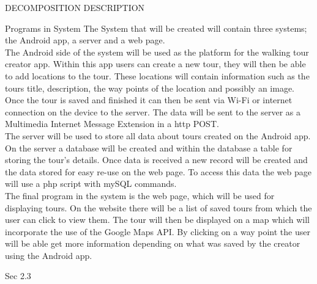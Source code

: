 \documentclass{article}
\begin{document}
	\begin{section}{DECOMPOSITION DESCRIPTION}
		\begin{subsection}{Programs in System}
		The System that will be created will contain three systems; the Android app, a server and a web page. \\

		The Android side of the system will be used as the platform for the walking tour creator app. Within this app users can create a new tour, they will then be able to add locations to the tour. These locations will contain information such as the tours title, description, the way points of the location and possibly an image. Once the tour is saved and finished it can then be sent via Wi-Fi or internet connection on the device to the server. The data will be sent to the server as a Multimedia Internet Message Extension in a http POST.\\

		The server will be used to store all data about tours created on the Android app. On the server a database will be created and within the database a table for storing the tour's details. Once data is received a new record will be created and the data stored for easy re-use on the web page. To access this data the web page will use a php script with mySQL commands.\\

		The final program in the system is the web page, which will be used for displaying tours. On the website there will be a list of saved tours from which the user can click to view them. The tour will then be displayed on a map which will incorporate the use of the Google Maps API. By clicking on a way point the user will be able get more information depending on what was saved by the creator using the Android app.
		\end{subsection}
	\end{section}
	
	\begin{section}{Sec 2.3}
	
	\end{section}
	
\end{document}
